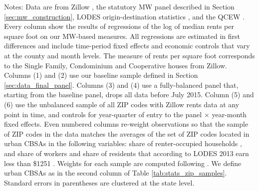 \begin{landscape}
\begin{table}[hbt!]
    \begin{minipage}{.95\linewidth} \footnotesize
        \vspace{2mm}
        Notes:
        Data are from Zillow \parencite{ZillowData}, 
        the statutory MW panel described in Section \ref{sec:mw_construction}, 
        LODES origin-destination statistics \parencite{CensusLODES},
        and the QCEW \parencite{QCEW}.
        Every column show the results of regressions of the log of 
        median rents per square foot on our MW-based measures.
        All regressions are estimated in first differences and include 
        time-period fixed effects and economic controls that vary at the 
        county and month levels.
        The measure of rents per square foot corresponds to the Single Family, 
        Condominium and Cooperative houses from Zillow.
        Columns (1) and (2) use our baseline sample defined in Section 
        \ref{sec:data_final_panel}.
        Columns (3) and (4) use a fully-balanced panel that, starting from the 
        baseline panel, drops all data before July 2015.
        Column (5) and (6) use the unbalanced sample of all ZIP codes with 
        Zillow rents data at any point in time, and controls for year-quarter of 
        entry to the panel $\times$ year-month fixed effects.
        Even numbered columns re-weight observations so that the sample of 
        ZIP codes in the data matches the averages of the set of ZIP codes
        located in urban CBSAs in the following variables:
        share of renter-occupied households \parencite{CensusDecennial}, and share of 
        workers and share of residents that according to LODES 2013 earn less than 
        \$1251 \parencite{CensusLODES}.
        Weights for each sample are computed following \textcite{Hainmueller2012}.
        We define urban CBSAs as in the second column of Table 
        \ref{tab:stats_zip_samples}.
        Standard errors in parentheses are clustered at the state level.
    \end{minipage}
\end{table}
\end{landscape}
